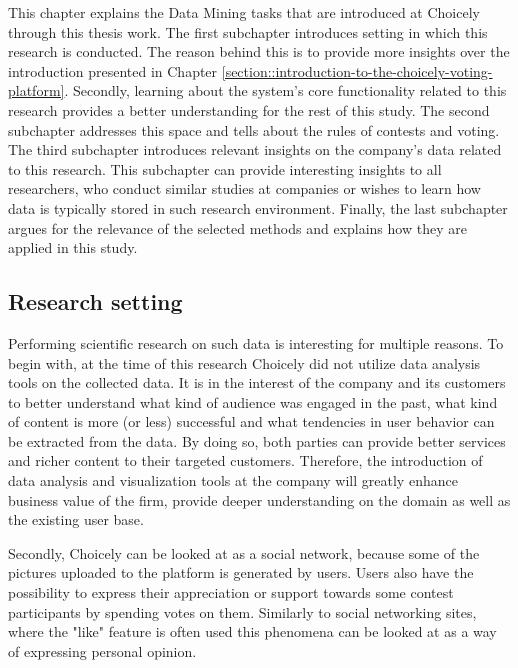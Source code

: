This chapter explains the Data Mining tasks that are introduced at Choicely through this thesis work. The first subchapter introduces setting in which this research is conducted. The reason behind this is to provide more insights over the introduction presented in Chapter \ref{section::introduction-to-the-choicely-voting-platform}. Secondly, learning about the system's core functionality related to this research provides a better understanding for the rest of this study. The second subchapter addresses this space and tells about the rules of contests and voting. The third subchapter introduces relevant insights on the company's data related to this research. This subchapter can provide interesting insights to all researchers, who conduct similar studies at companies or wishes to learn how data is typically stored in such research environment. Finally, the last subchapter argues for the relevance of the selected methods and explains how they are applied in this study. 

\subsection{Research setting}
    Performing scientific research on such data is interesting for multiple reasons. To begin with, at the time of this research Choicely did not utilize data analysis tools on the collected data. It is in the interest of the company and its customers to better understand what kind of audience was engaged in the past, what kind of content is more (or less) successful and what tendencies in user behavior can be extracted from the data. By doing so, both parties can provide better services and richer content to their targeted customers. Therefore, the introduction of data analysis and visualization tools at the company will greatly enhance business value of the firm, provide deeper understanding on the domain as well as the existing user base.   
    
    Secondly, Choicely can be looked at as a social network, because some of the pictures uploaded to the platform is generated by users. Users also have the possibility to express their appreciation or support towards some contest participants by spending votes on them. Similarly to social networking sites, where the "like" feature is often used \cite{jang2015noreciprocity, bakhshi2014faces} this phenomena can be looked at as a way of expressing personal opinion. 
    
